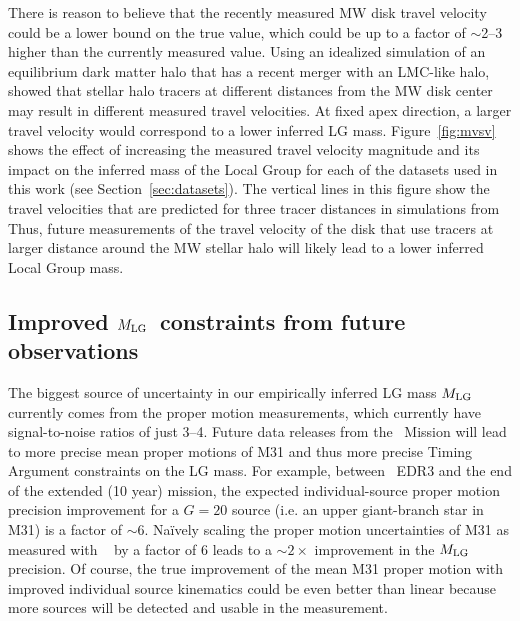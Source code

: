 \documentclass[twocolumn]{aastex631}
\newcommand{\kc}[1]{\textcolor{pink}{\textbf{#1}} }
\newcommand{\mlg}{\ensuremath{M_{\rm LG}}}
\begin{document}
There is reason to believe that the recently measured MW disk travel velocity
could be a lower bound on the true value, which could be up to a factor of
$\sim$2--3 higher than the currently measured value.
Using an idealized simulation of an equilibrium dark matter halo that has a
recent merger with an LMC-like halo, \cite{Garavito-Camargo2021b} showed that
stellar halo tracers at different distances from the MW disk center may result
in different measured travel velocities.
At fixed apex direction, a larger travel velocity would correspond to a lower
inferred LG mass.
Figure~\ref{fig:mvsv} shows the effect of increasing the measured travel
velocity magnitude and its impact on the inferred mass of the Local Group for
each of the datasets used in this work (see Section~\ref{sec:datasets}).
The vertical lines in this figure show the travel velocities that are predicted
for three tracer distances in simulations from~\cite{Garavito-Camargo2021b}
Thus, future measurements of the travel velocity of the disk that use tracers at
larger distance around the MW stellar halo will likely lead to a lower inferred
Local Group mass.

\subsection{Improved \mlg\ constraints from future observations}

The biggest source of uncertainty in our empirically inferred LG mass $\mlg$ currently comes
from the proper motion measurements, which currently have signal-to-noise ratios
of just 3--4.
Future data releases from the \gaia\ Mission \citep{GaiaOverview2016} will lead
to more precise mean proper motions of M31 and thus more precise Timing Argument
constraints on the LG mass.
For example, between \gaia\ EDR3 and the end of the extended (10 year) mission,
the expected individual-source proper motion precision improvement for a $G=20$
source (i.e. an upper giant-branch star in M31) is a factor of $\sim$6.
Na\"ively scaling the proper motion uncertainties of M31 as measured with \gaia\
\citep{Salomon2021} by a factor of 6 leads to a $\sim2\times$ improvement in the
$\mlg$ precision.
Of course, the true improvement of the mean M31 proper motion with improved
individual source kinematics could be even better than linear because more
sources will be detected and usable in the measurement.
\end{document}
